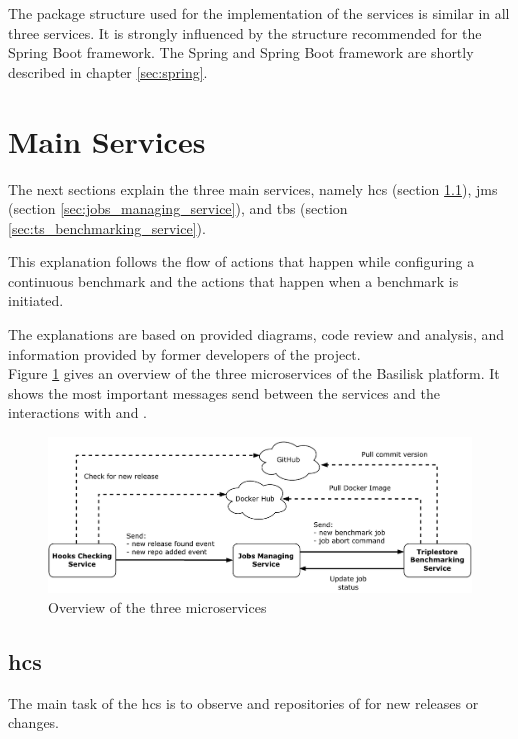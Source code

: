The package structure used for the implementation of the services is similar in all three services.
It is strongly influenced by the structure recommended for the Spring Boot framework.
The Spring and Spring Boot framework are shortly described in chapter \ref{sec:spring}.


\section{Main Services}
\label{sec:main_services}
The next sections explain the three main services, namely \acl{hcs} (section \ref{sec:hooks_checking_service}), \acl{jms} (section \ref{sec:jobs_managing_service}), and \acl{tbs} (section \ref{sec:ts_benchmarking_service}).

This explanation follows the flow of actions that happen while configuring a continuous benchmark and the actions that happen when a benchmark is initiated.

The explanations are based on provided diagrams, code review and analysis, and information provided by former developers of the project.
\\

Figure \ref{fig:basilisk_high_level_design_approach} gives an overview of the three microservices of the Basilisk platform.
It shows the most important messages send between the services and the interactions with \gh{} and \dockh{}.
\begin{figure}[tbph]
	\centering
	\includegraphics[width=1\textwidth]{figures/high-level-design-approach.pdf}
	\caption{Overview of the three microservices}
	\label{fig:basilisk_high_level_design_approach}
\end{figure}



\subsection{\acl{hcs}}
\label{sec:hooks_checking_service}
The main task of the \ac{hcs} is to observe \gh{} and \dockh{} repositories of \tsp{} for new releases or changes.

